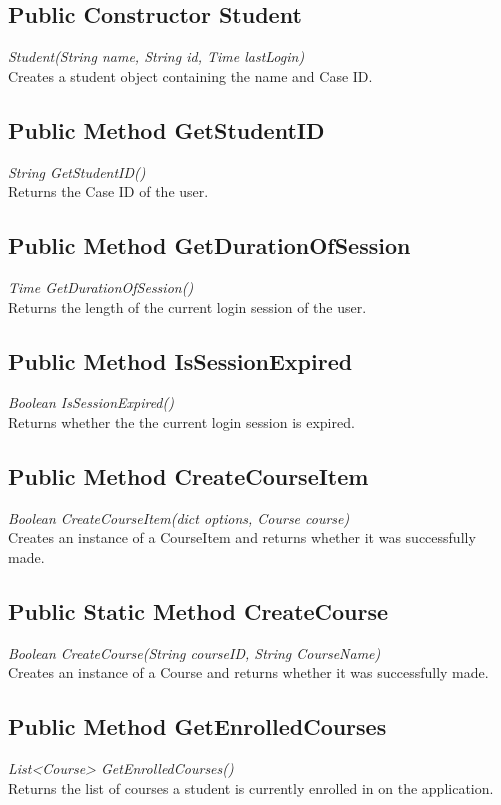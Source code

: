 \documentclass[16pt]{scrreprt}
\begin{document}
\subsection{Public Constructor Student}
\textit{Student(String name, String id, Time lastLogin)} \\
Creates a student object containing the name and Case ID.

\subsection{Public Method GetStudentID}
\textit{String GetStudentID()} \\
Returns the Case ID of the user.

\subsection{Public Method GetDurationOfSession}
\textit{Time GetDurationOfSession()} \\
Returns the length of the current login session of the user.

\subsection{Public Method IsSessionExpired}
\textit{Boolean IsSessionExpired()} \\
Returns whether the the current login session is expired.

\subsection{Public Method CreateCourseItem}
\textit{Boolean CreateCourseItem(dict options, Course course)} \\
Creates an instance of a CourseItem and returns whether it was successfully made.

\subsection{Public Static Method CreateCourse}
\textit{Boolean CreateCourse(String courseID, String CourseName)} \\
Creates an instance of a Course and returns whether it was	 successfully made.

\subsection{Public Method GetEnrolledCourses}
\textit{List<Course> GetEnrolledCourses()} \\
Returns the list of courses a student is currently enrolled in on the application.
\end{document}
